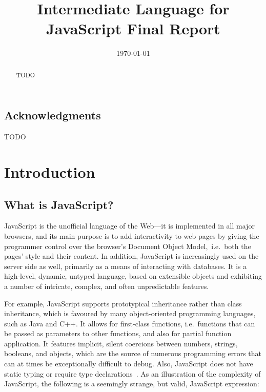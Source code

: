\documentclass[a4paper,11pt,twoside]{report}
\title{Intermediate Language for JavaScript Final Report}
\date{\today}
\begin{document}


\clearpage{\pagestyle{empty}\cleardoublepage}
\setcounter{page}{1}
\pagestyle{fancy}

\begin{abstract}
TODO
\end{abstract}

\cleardoublepage
\section*{Acknowledgments}
TODO

\clearpage{\pagestyle{empty}\cleardoublepage}

\tableofcontents 


\clearpage{\pagestyle{empty}\cleardoublepage}
\setcounter{page}{1}
\fancyhead[LE,RO]{\slshape \rightmark}
\fancyhead[LO,RE]{\slshape \leftmark}

\chapter{Introduction}

\section{What is JavaScript?}
JavaScript is the unofficial language of the Web---it is implemented in all major browsers, and its main purpose is to add interactivity to web pages by giving the programmer control over the browser's Document Object Model,~i.e.~both the pages' style and their content. In addition, JavaScript is increasingly used on the server side as well, primarily as a means of interacting with databases. It is a high-level, dynamic, untyped language, based on extensible objects and exhibiting a number of intricate, complex, and often unpredictable features. 

For example, JavaScript supports prototypical inheritance rather than class inheritance, which is favoured by many object-oriented programming languages, such as Java and C++. It allows for first-class functions, i.e.~functions that can be passed as parameters to other functions, and also for partial function application. It features implicit, silent coercions between numbers, strings, booleans, and objects, which are the source of numerous programming errors that can at times be exceptionally difficult to debug.
Also, JavaScript does not have static typing or require type declarations~\cite{EcmaScript}. As an illustration of the complexity of JavaScript, the following is a seemingly strange, but valid, JavaScript expression:
\end{document}

